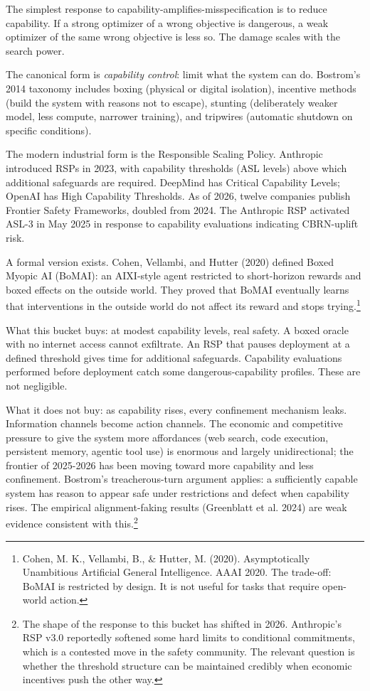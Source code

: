The simplest response to capability-amplifies-misspecification is to reduce capability. If a strong optimizer of a wrong objective is dangerous, a weak optimizer of the same wrong objective is less so. The damage scales with the search power.

The canonical form is \emph{capability control}: limit what the system can do. Bostrom's 2014 taxonomy includes boxing (physical or digital isolation), incentive methods (build the system with reasons not to escape), stunting (deliberately weaker model, less compute, narrower training), and tripwires (automatic shutdown on specific conditions).

The modern industrial form is the Responsible Scaling Policy. Anthropic introduced RSPs in 2023, with capability thresholds (ASL levels) above which additional safeguards are required. DeepMind has Critical Capability Levels; OpenAI has High Capability Thresholds. As of 2026, twelve companies publish Frontier Safety Frameworks, doubled from 2024. The Anthropic RSP activated ASL-3 in May 2025 in response to capability evaluations indicating CBRN-uplift risk.

A formal version exists. Cohen, Vellambi, and Hutter (2020) defined Boxed Myopic AI (BoMAI): an AIXI-style agent restricted to short-horizon rewards and boxed effects on the outside world. They proved that BoMAI eventually learns that interventions in the outside world do not affect its reward and stops trying.\footnote{Cohen, M. K., Vellambi, B., \& Hutter, M. (2020). Asymptotically Unambitious Artificial General Intelligence. AAAI 2020. The trade-off: BoMAI is restricted by design. It is not useful for tasks that require open-world action.}

What this bucket buys: at modest capability levels, real safety. A boxed oracle with no internet access cannot exfiltrate. An RSP that pauses deployment at a defined threshold gives time for additional safeguards. Capability evaluations performed before deployment catch some dangerous-capability profiles. These are not negligible.

What it does not buy: as capability rises, every confinement mechanism leaks. Information channels become action channels. The economic and competitive pressure to give the system more affordances (web search, code execution, persistent memory, agentic tool use) is enormous and largely unidirectional; the frontier of 2025-2026 has been moving toward more capability and less confinement. Bostrom's treacherous-turn argument applies: a sufficiently capable system has reason to appear safe under restrictions and defect when capability rises. The empirical alignment-faking results (Greenblatt et al. 2024) are weak evidence consistent with this.\footnote{The shape of the response to this bucket has shifted in 2026. Anthropic's RSP v3.0 reportedly softened some hard limits to conditional commitments, which is a contested move in the safety community. The relevant question is whether the threshold structure can be maintained credibly when economic incentives push the other way.}

